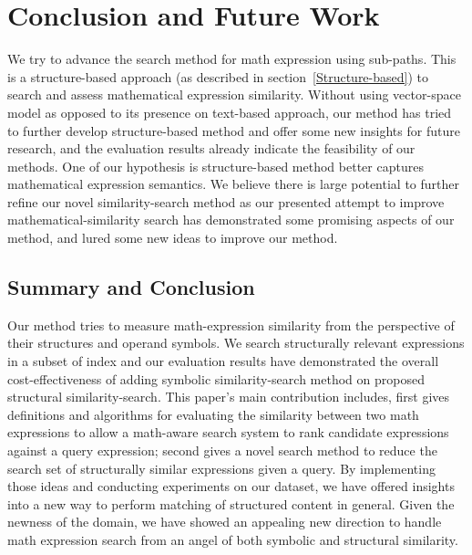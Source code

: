\chapter{Conclusion and Future Work}
We try to advance the search method for math expression using sub-paths.
This is a structure-based approach (as described in section~\ref{Structure-based}) to search and assess mathematical expression similarity.
Without using vector-space model as opposed to its presence on text-based approach, our method has tried to further develop structure-based method and offer some new insights for future research, 
and the evaluation results already indicate the feasibility of our methods.
One of our hypothesis is structure-based method better captures mathematical expression semantics. 
We believe there is large potential to further refine our novel similarity-search method as our presented attempt to improve mathematical-similarity search has demonstrated some promising aspects of our method, and lured some new ideas to improve our method.

\section{Summary and Conclusion}
Our method tries to measure math-expression similarity from the perspective of their structures and operand symbols. 
We search structurally relevant expressions in a subset of index and our evaluation results have demonstrated the overall cost-effectiveness of adding symbolic similarity-search method on proposed structural similarity-search.
This paper's main contribution includes, 
first gives definitions and algorithms for evaluating the similarity between two math expressions to allow a math-aware search system to rank candidate expressions against a query expression;
second gives a novel search method to reduce the search set of structurally similar expressions given a query. 
By implementing those ideas and conducting experiments on our dataset, we have offered insights into a new way to perform matching of structured content in general.
Given the newness of the domain, we have showed an appealing new direction to handle math expression search from an angel of both symbolic and structural similarity. 

